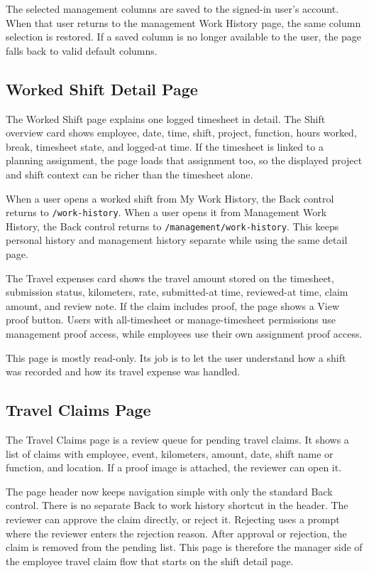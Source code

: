 \documentclass[11pt]{article}
\newcommand{\code}[1]{\nolinkurl{#1}}
\begin{document}
The selected management columns are saved to the signed-in user's account. When that user returns to the management Work History page, the same column selection is restored. If a saved column is no longer available to the user, the page falls back to valid default columns.

\subsection{Worked Shift Detail Page}

The Worked Shift page explains one logged timesheet in detail. The Shift overview card shows employee, date, time, shift, project, function, hours worked, break, timesheet state, and logged-at time. If the timesheet is linked to a planning assignment, the page loads that assignment too, so the displayed project and shift context can be richer than the timesheet alone.

When a user opens a worked shift from My Work History, the Back control returns to \code{/work-history}. When a user opens it from Management Work History, the Back control returns to \code{/management/work-history}. This keeps personal history and management history separate while using the same detail page.

The Travel expenses card shows the travel amount stored on the timesheet, submission status, kilometers, rate, submitted-at time, reviewed-at time, claim amount, and review note. If the claim includes proof, the page shows a View proof button. Users with all-timesheet or manage-timesheet permissions use management proof access, while employees use their own assignment proof access.

This page is mostly read-only. Its job is to let the user understand how a shift was recorded and how its travel expense was handled.

\subsection{Travel Claims Page}

The Travel Claims page is a review queue for pending travel claims. It shows a list of claims with employee, event, kilometers, amount, date, shift name or function, and location. If a proof image is attached, the reviewer can open it.

The page header now keeps navigation simple with only the standard Back control. There is no separate Back to work history shortcut in the header. The reviewer can approve the claim directly, or reject it. Rejecting uses a prompt where the reviewer enters the rejection reason. After approval or rejection, the claim is removed from the pending list. This page is therefore the manager side of the employee travel claim flow that starts on the shift detail page.
\end{document}
